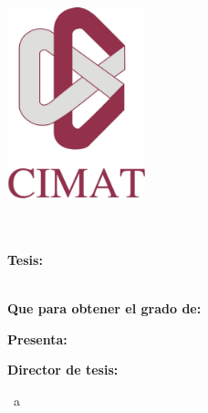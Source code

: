 \begin{titlepage}
	\begin{addmargin}[-1cm]{-3cm}
    \begin{center}
        \includegraphics[width=4cm]{gfx/logo-big2} \\ \medskip    
        {\Large \myUni} \\ 
        \myDepartment \\                                           

        \hfill
        \vfill
        \large  
                
        \textbf{Tesis:}\\
        \begingroup
            \color{Maroon}\spacedallcaps{\myTitle} \\ \bigskip
        \endgroup
        \vspace{0.6cm}
        
        \textbf{Que para obtener el grado de:}\\
        \spacedlowsmallcaps{\myDegree} \vspace{1cm}

        \textbf{Presenta:}\\
        \spacedlowsmallcaps{\myName} \vspace{1cm}
        
        \textbf{Director de tesis:}\\
        \spacedlowsmallcaps{\myProf}

        \vfill
        \bigskip

        \vfill                      
        \myLocation ~a~ \myTime

    \end{center}  
  \end{addmargin}       
\end{titlepage}   